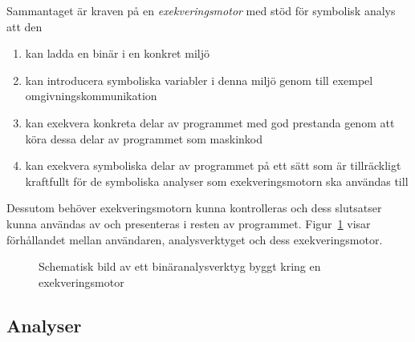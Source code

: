 Sammantaget är kraven på en \textit{exekveringsmotor} med stöd för symbolisk
analys att den
\begin{enumerate}
    \item kan ladda en binär i en konkret miljö
    \item kan introducera symboliska variabler i denna miljö genom till exempel
        omgivningskommunikation
    \item kan exekvera konkreta delar av programmet med god prestanda genom att
        köra dessa delar av programmet som maskinkod
    \item kan exekvera symboliska delar av programmet på ett sätt som är
        tillräckligt kraftfullt för de symboliska analyser som exekveringsmotorn
        ska användas till
\end{enumerate}
Dessutom behöver exekveringsmotorn kunna kontrolleras och dess slutsatser kunna
användas av och presenteras i resten av programmet. Figur~\ref{schematic} visar
förhållandet mellan användaren, analysverktyget och dess exekveringsmotor.

\begin{figure}[H]
	\centering
	\caption{
  Schematisk bild av ett binäranalysverktyg byggt kring en exekveringsmotor
  }\label{schematic}
\end{figure}

\subsection{Analyser}

